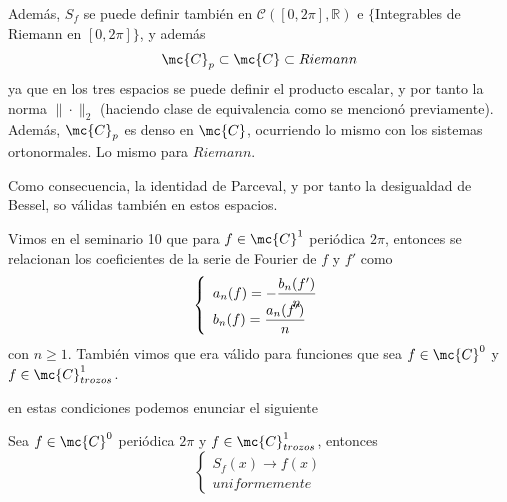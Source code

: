     \begin{prop}
        Además, $S_f$ se puede definir también en $\mathcal{C}([0,2\pi],\mathbb R)$ e $\{$Integrables de Riemann en $[0,2\pi]\}$, y además
        $$\mc{C}_p\subset \mc{C} \subset Riemann$$
        ya que en los tres espacios se puede definir el producto escalar, y por tanto la norma $\|\cdot\|_2$ (haciendo clase de equivalencia como se mencionó previamente). Además, $\mc{C}_p$ es denso en $\mc{C}$, ocurriendo lo mismo con los sistemas ortonormales. Lo mismo para $Riemann$.
    \end{prop}
    \begin{cor}
        Como consecuencia, la identidad de Parceval, y por tanto la desigualdad de Bessel, so válidas también en estos espacios.
    \end{cor}
    \begin{obs}
        Vimos en el seminario 10 que para $f \in \mc{C}^1$ periódica $2\pi$, entonces se relacionan los coeficientes de la serie de Fourier de $f$ y $f'$ como
        $$\left\{ \begin{array}{l}
             a_n(f)=-\dfrac{b_n(f')}{n}  \\
             \vspace{-5mm} \\
             b_n(f)=\dfrac{a_n(f')}{n}
        \end{array}\right.$$
        con $n \geq 1$. También vimos que era válido para funciones que sea $f \in \mc{C}^0$ y $f \in \mc{C}^1_{trozos}$.
    \end{obs}
    en estas condiciones podemos enunciar el siguiente
    \begin{teo}
        Sea $f \in \mc{C}^0$ periódica $2\pi$ y $f \in \mc{C}^1_{trozos}$, entonces
        $$\left\{ \begin{array}{c}
             S_f(x) \longrightarrow f(x)  \\
             uniformemente 
        \end{array}\right.$$
    \end{teo}
